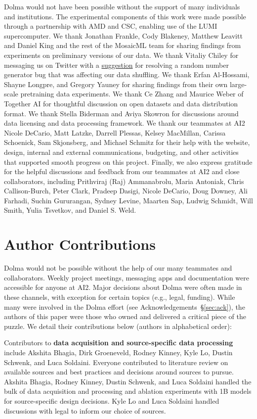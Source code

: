 \documentclass{article}
\newcommand{\dolma}{Dolma\xspace}
\begin{document}
\dolma would not have been possible without the support of many individuals and institutions. 
The experimental components of this work were made possible through a partnership with AMD and CSC, enabling use of the LUMI supercomputer.
We thank Jonathan Frankle, Cody Blakeney, Matthew Leavitt and Daniel King and the rest of the MosaicML team for sharing findings from experiments on preliminary versions of our data.
We thank Vitaliy Chiley for messaging us on Twitter with a \href{https://twitter.com/vitaliychiley/status/1675594766799769600}{suggestion} for resolving a random number generator bug that was affecting our data shuffling.
We thank Erfan Al-Hossami, Shayne Longpre, and Gregory Yauney for sharing findings from their own large-scale pretraining data experiments.
We thank Ce Zhang and Maurice Weber of Together AI for thoughtful discussion on open datasets and data distribution format.
We thank Stella Biderman and Aviya Skowron for discussions around data licensing and data processing framework.
We thank our teammates at AI2 Nicole DeCario, Matt Latzke, Darrell Plessas, Kelsey MacMillan, Carissa Schoenick, Sam Skjonsberg, and Michael Schmitz for their help with the website, design, internal and external communications, budgeting, and other activities that supported smooth progress on this project.
Finally, we also express gratitude for the helpful discussions and feedback from our teammates at AI2 and close collaborators, including Prithviraj (Raj) Ammanabrolu, Maria Antoniak, Chris Callison-Burch, Peter Clark, Pradeep Dasigi, Nicole DeCario, Doug Downey, Ali Farhadi, Suchin Gururangan, Sydney Levine, Maarten Sap, Ludwig Schmidt, Will Smith, Yulia Tsvetkov, and Daniel S. Weld.

\section{Author Contributions}
\label{sec:contrib}

Dolma would not be possible without the help of our many teammates and collaborators. Weekly project meetings, messaging apps and documentation were accessible for anyone at AI2. Major decisions about Dolma were often made in these channels, with exception for certain topics (e.g., legal, funding). While many were involved in the Dolma effort (see Acknowledgements~\S\ref{sec:ack}), the authors of this paper were those who owned and delivered a critical piece of the puzzle. We detail their contributions below (authors in alphabetical order):

Contributors to \textbf{data acquisition and source-specific data processing} include Akshita Bhagia, Dirk Groeneveld, Rodney Kinney, Kyle Lo, Dustin Schwenk, and Luca Soldaini. Everyone contributed to literature review on available sources and best practices and decisions around sources to pursue. Akshita Bhagia, Rodney Kinney, Dustin Schwenk, and Luca Soldaini handled the bulk of data acquisition and processing and ablation experiments with 1B models for source-specific design decisions. Kyle Lo and Luca Soldaini handled discussions with legal to inform our choice of sources.
\end{document}
